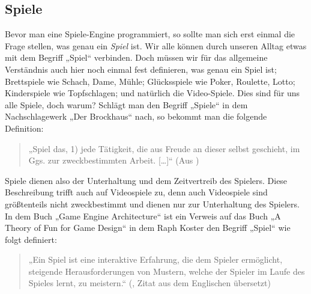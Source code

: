 \subsection{Spiele}	

Bevor man eine Spiele-Engine programmiert, so sollte man sich erst einmal die Frage stellen, was genau ein \textit{Spiel} ist. Wir alle können durch unseren Alltag etwas mit dem Begriff „Spiel“ verbinden. Doch müssen wir für das allgemeine Verständnis auch hier noch einmal fest definieren, was genau ein Spiel ist;
Brettspiele wie Schach, Dame, Mühle; Glücksspiele wie Poker, Roulette, Lotto; Kinderspiele wie Topfschlagen; und natürlich die Video-Spiele. 
Dies sind für uns alle Spiele, doch warum?
Schlägt man den Begriff „Spiele“ in dem Nachschlagewerk „Der Brockhaus“ nach, so bekommt man die folgende Definition:

\begin{quote}
	„Spiel das, 1) jede Tätigkeit, die aus Freude an dieser selbst geschieht, im Ggs. zur zweckbestimmten Arbeit. […]“ (Aus \cite{brockhaus})
\end{quote}

Spiele dienen also der Unterhaltung und dem Zeitvertreib des Spielers.
Diese Beschreibung trifft auch auf Videospiele zu, denn auch Videospiele sind größtenteils nicht zweckbestimmt und dienen nur zur Unterhaltung des Spielers.
In dem Buch „Game Engine Architecture“ \cite{gea} ist ein Verweis auf das Buch „A Theory
of Fun for Game Design“ in dem Raph Koster den Begriff „Spiel“ wie folgt definiert:

\begin{quote}
	„Ein Spiel ist eine interaktive Erfahrung, die dem Spieler ermöglicht, steigende Herausforderungen von Mustern, welche der Spieler im Laufe des Spieles lernt, zu meistern.“
	(\cite{theoryoffun}, Zitat aus dem Englischen übersetzt)
\end{quote}